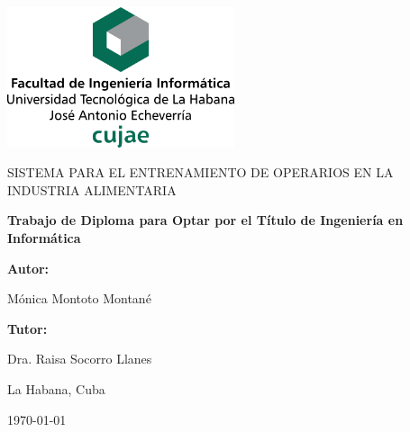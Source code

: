 \begin{titlepage}

\centering

{\includegraphics[width=0.5\textwidth]{imagen/cujae}\par}

\vspace{4cm}

{\scshape\Large SISTEMA PARA EL ENTRENAMIENTO DE OPERARIOS EN LA INDUSTRIA ALIMENTARIA \par}
\vspace{1cm}

{\bfseries\Large Trabajo de Diploma para Optar por el Título de Ingeniería en Informática\par}
\vspace{3cm}

{\bfseries\Large Autor:} { \Large Mónica Montoto Montané \par}
{\bfseries\Large Tutor: }{\Large Dra. Raisa Socorro Llanes \par}
\vfill

{\Large La Habana, Cuba \par}

\large{\mifecha\today}

\end{titlepage}


